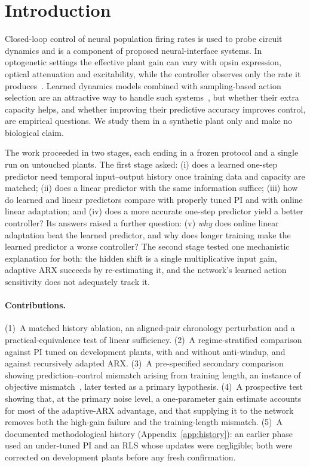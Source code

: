 \documentclass[11pt]{article}
\begin{document}
\section{Introduction}
Closed-loop control of neural population firing rates is used to probe circuit dynamics and is a component of proposed neural-interface systems. In optogenetic settings the effective plant gain can vary with opsin expression, optical attenuation and excitability, while the controller observes only the rate it produces~\cite{newman2015}. Learned dynamics models combined with sampling-based action selection are an attractive way to handle such systems~\cite{nagabandi2018}, but whether their extra capacity helps, and whether improving their predictive accuracy improves control, are empirical questions. We study them in a synthetic plant only and make no biological claim.

The work proceeded in two stages, each ending in a frozen protocol and a single run on untouched plants. The first stage asked: (i) does a learned one-step predictor need temporal input--output history once training data and capacity are matched; (ii) does a linear predictor with the same information suffice; (iii) how do learned and linear predictors compare with properly tuned PI and with online linear adaptation; and (iv) does a more accurate one-step predictor yield a better controller? Its answers raised a further question: (v) \emph{why} does online linear adaptation beat the learned predictor, and why does longer training make the learned predictor a worse controller? The second stage tested one mechanistic explanation for both: the hidden shift is a single multiplicative input gain, adaptive ARX succeeds by re-estimating it, and the network's learned action sensitivity does not adequately track it.

\paragraph{Contributions.}
(1)~A matched history ablation, an aligned-pair chronology perturbation and a practical-equivalence test of linear sufficiency. (2)~A regime-stratified comparison against PI tuned on development plants, with and without anti-windup, and against recursively adapted ARX. (3)~A pre-specified secondary comparison showing prediction--control mismatch arising from training length, an instance of objective mismatch~\cite{lambert2020}, later tested as a primary hypothesis. (4)~A prospective test showing that, at the primary noise level, a one-parameter gain estimate accounts for most of the adaptive-ARX advantage, and that supplying it to the network removes both the high-gain failure and the training-length mismatch. (5)~A documented methodological history (Appendix~\ref{app:history}): an earlier phase used an under-tuned PI and an RLS whose updates were negligible; both were corrected on development plants before any fresh confirmation.
\end{document}
